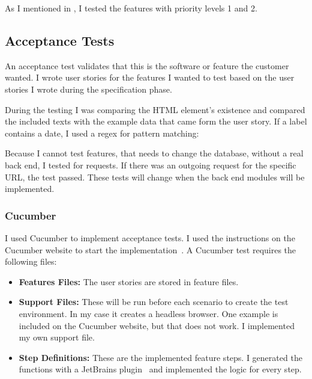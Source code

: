 As I mentioned in , I tested the features with priority levels 1 and 2.

\subsection{Acceptance Tests}
An acceptance test validates that this is the software or feature the customer wanted. I wrote user stories  for the features I wanted to test based on the user stories I wrote during the specification phase. 

During the testing I was comparing the HTML element's existence and compared the included texts with the example data that came form the user story. If a label contains a date, I used a regex for pattern matching:


Because I cannot test features, that needs to change the database, without a real back end, I tested for requests. If there was an outgoing request for the specific URL, the test passed. These tests will change when the back end modules will be implemented.

\subsubsection{Cucumber}
\label{cucumber-test}

I used Cucumber  to implement acceptance tests. I used the instructions on the Cucumber website to start the implementation~\cite{github-cucumberjs}. A Cucumber test requires the following files:

\begin{itemize}
	\item \textbf{Features Files:} The user stories are stored in feature files.
	\item \textbf{Support Files:} These will be run before each scenario to create the test environment. In my case it creates a headless browser. One example is included on the Cucumber website, but that does not work. I implemented my own support file.
	\item \textbf{Step Definitions:} These are the implemented feature steps. I generated the functions with a JetBrains plugin~\cite{jetbrains-cucumber} and implemented the logic for every step. 
\end{itemize}

